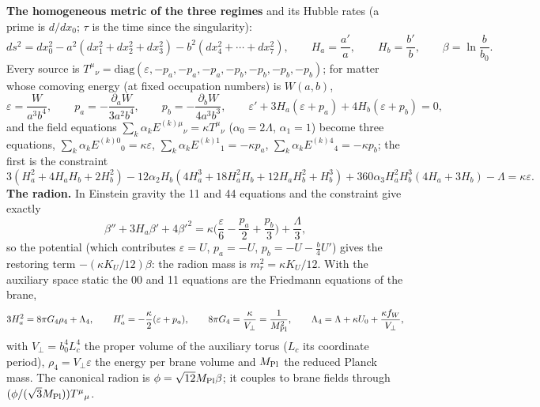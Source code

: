 \documentclass[10pt,a4paper]{article}
\begin{document}
\textbf{The homogeneous metric of the three regimes} and its Hubble rates (a prime is $d/dx_0$; $\tau$ is the time since the singularity):
\begin{equation*}
ds^2=dx_0^2-a^2(dx_1^2+dx_2^2+dx_3^2)-b^2(dx_4^2+\cdots+dx_7^2),\qquad H_a=\frac{a'}a,\qquad H_b=\frac{b'}b,\qquad \beta=\ln\frac b{b_0}.
\end{equation*}
Every source is $T^\mu{}_\nu=\mathrm{diag}(\varepsilon,-p_a,-p_a,-p_a,-p_b,-p_b,-p_b,-p_b)$; for matter whose comoving energy (at fixed occupation numbers) is $W(a,b)$,
\begin{equation*}
\varepsilon=\frac W{a^3b^4},\qquad p_a=-\frac{\partial_aW}{3a^2b^4},\qquad p_b=-\frac{\partial_bW}{4a^3b^3},\qquad \varepsilon'+3H_a(\varepsilon+p_a)+4H_b(\varepsilon+p_b)=0,
\end{equation*}
and the field equations $\sum_k\alpha_kE^{(k)\mu}{}_\nu=\kappa T^\mu{}_\nu$ ($\alpha_0=2\Lambda$, $\alpha_1=1$) become three equations, $\sum_k\alpha_kE^{(k)0}{}_0=\kappa\varepsilon$, $\sum_k\alpha_kE^{(k)1}{}_1=-\kappa p_a$, $\sum_k\alpha_kE^{(k)4}{}_4=-\kappa p_b$; the first is the constraint
\begin{equation*}
3(H_a^2+4H_aH_b+2H_b^2)-12\alpha_2H_b(4H_a^3+18H_a^2H_b+12H_aH_b^2+H_b^3)+360\alpha_3H_a^2H_b^3(4H_a+3H_b)-\Lambda=\kappa\varepsilon .
\end{equation*}
\textbf{The radion.} In Einstein gravity the 11 and 44 equations and the constraint give exactly
\begin{equation*}
\beta''+3H_a\beta'+4\beta'^2=\kappa\Big(\frac\varepsilon6-\frac{p_a}2+\frac{p_b}3\Big)+\frac\Lambda3,
\end{equation*}
so the potential (which contributes $\varepsilon=U$, $p_a=-U$, $p_b=-U-\frac b4U'$) gives the restoring term $-(\kappa K_U/12)\beta$: the radion mass is $m_r^2=\kappa K_U/12$. With the auxiliary space static the 00 and 11 equations are the Friedmann equations of the brane,
\begin{equation*}
3H_a^2=8\pi G_4\rho_4+\Lambda_4,\qquad H_a'=-\frac\kappa2(\varepsilon+p_a),\qquad 8\pi G_4=\frac\kappa{V_\perp}=\frac1{M_{\rm Pl}^2},\qquad \Lambda_4=\Lambda+\kappa U_0+\frac{\kappa f_W}{V_\perp},
\end{equation*}
with $V_\perp=b_0^4L_c^4$ the proper volume of the auxiliary torus ($L_c$ its coordinate period), $\rho_4=V_\perp\varepsilon$ the energy per brane volume and $M_{\rm Pl}$ the reduced Planck mass. The canonical radion is $\phi=\sqrt{12}M_{\rm Pl}\beta$; it couples to brane fields through $(\phi/(\sqrt3M_{\rm Pl}))T^\mu{}_\mu$.
\end{document}
